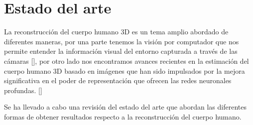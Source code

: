 \newpage


\section{Estado del arte}
La reconstrucción del cuerpo humano 3D es un tema amplio abordado de diferentes maneras, por una parte tenemos la visión por computador que nos permite entender la información visual del entorno capturada a través de las cámaras [\cite{Zhang1}], por otro lado nos encontramos avances recientes en la estimación del cuerpo humano 3D basado en imágenes que han sido impulsados por la mejora significativa en el poder de representación que ofrecen las redes neuronales profundas. [\cite{pifuhd}]

Se ha llevado a cabo una revisión del estado del arte que abordan las diferentes formas de obtener resultados respecto a la reconstrucción del cuerpo humano.
\\

